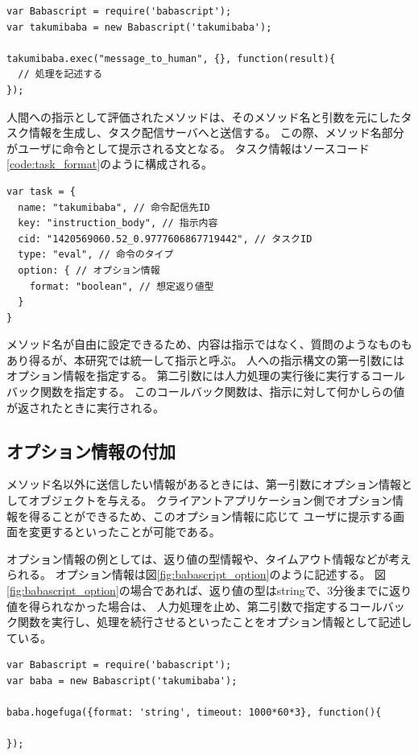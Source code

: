 \begin{lstlisting}[caption=execメソッドによる指示構文, label=code:babascriptux5fexecux5fmethod]
var Babascript = require('babascript');
var takumibaba = new Babascript('takumibaba');

takumibaba.exec("message_to_human", {}, function(result){
  // 処理を記述する
});
\end{lstlisting}

人間への指示として評価されたメソッドは、そのメソッド名と引数を元にしたタスク情報を生成し、タスク配信サーバへと送信する。
この際、メソッド名部分がユーザに命令として提示される文となる。
タスク情報はソースコード\ref{code:task_format}のように構成される。

\begin{lstlisting}[caption=タスク情報の例, label=code:taskux5fformat]
var task = {
  name: "takumibaba", // 命令配信先ID
  key: "instruction_body", // 指示内容
  cid: "1420569060.52_0.9777606867719442", // タスクID
  type: "eval", // 命令のタイプ
  option: { // オプション情報
    format: "boolean", // 想定返り値型
  }
}
\end{lstlisting}

メソッド名が自由に設定できるため、内容は指示ではなく、質問のようなものもあり得るが、本研究では統一して指示と呼ぶ。
人への指示構文の第一引数にはオプション情報を指定する。
第二引数には人力処理の実行後に実行するコールバック関数を指定する。
このコールバック関数は、指示に対して何かしらの値が返されたときに実行される。

\subsection{オプション情報の付加}\label{ux30aaux30d7ux30b7ux30e7ux30f3ux60c5ux5831ux306eux4ed8ux52a0}

メソッド名以外に送信したい情報があるときには、第一引数にオプション情報としてオブジェクトを与える。
クライアントアプリケーション側でオプション情報を得ることができるため、このオプション情報に応じて
ユーザに提示する画面を変更するといったことが可能である。

オプション情報の例としては、返り値の型情報や、タイムアウト情報などが考えられる。
オプション情報は図\ref{fig:babascript_option}のように記述する。
図\ref{fig:babascript_option}の場合であれば、返り値の型はstringで、3分後までに返り値を得られなかった場合は、
人力処理を止め、第二引数で指定するコールバック関数を実行し、処理を続行させるといったことをオプション情報として記述している。

\begin{lstlisting}[caption=オプション情報のサンプルソースコードその1, label=code:babascriptux5foption]
var Babascript = require('babascript');
var baba = new Babascript('takumibaba');

baba.hogefuga({format: 'string', timeout: 1000*60*3}, function(){

});
\end{lstlisting}


